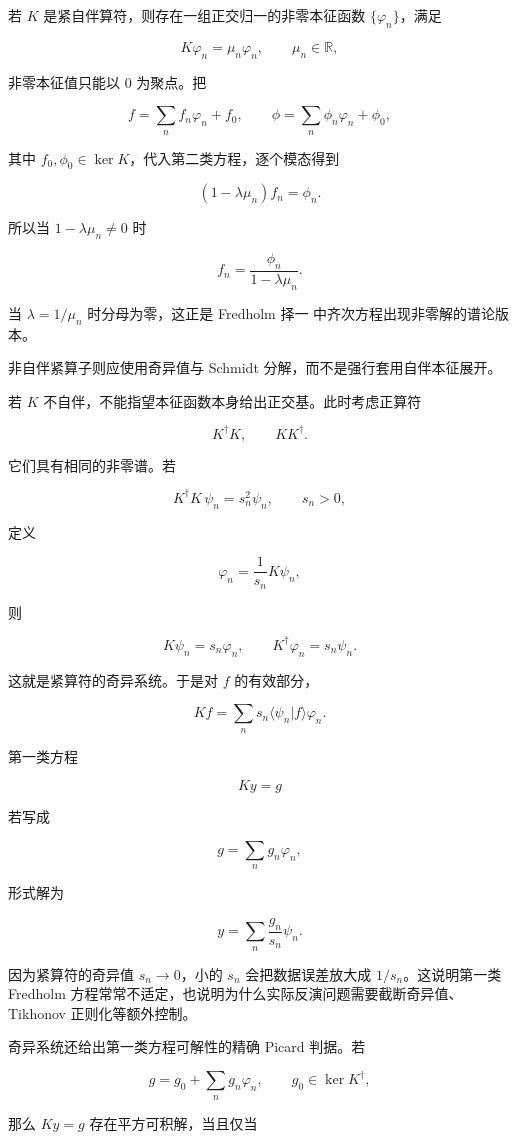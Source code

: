 若 $K$ 是紧自伴算符，则存在一组正交归一的非零本征函数 $\{\varphi_n\}$，满足

\[
K\varphi_n=\mu_n\varphi_n,
\qquad \mu_n\in\mathbb R,
\]

非零本征值只能以 $0$ 为聚点。把

\[
f=\sum_n f_n\varphi_n+f_0,
\qquad
\phi=\sum_n\phi_n\varphi_n+\phi_0,
\]

其中 $f_0,\phi_0\in\ker K$，代入第二类方程，逐个模态得到

\[
(1-\lambda\mu_n)f_n=\phi_n.
\]

所以当 $1-\lambda\mu_n\neq0$ 时

\[
\boxed{f_n=\frac{\phi_n}{1-\lambda\mu_n}}.
\]

当 $\lambda=1/\mu_n$ 时分母为零，这正是 Fredholm 择一 中齐次方程出现非零解的谱论版本。

非自伴紧算子则应使用奇异值与 Schmidt 分解，而不是强行套用自伴本征展开。

若 $K$ 不自伴，不能指望本征函数本身给出正交基。此时考虑正算符

\[
K^\dagger K,\qquad KK^\dagger.
\]

它们具有相同的非零谱。若

\[
K^\dagger K\,\psi_n=s_n^2\psi_n,
\qquad s_n>0,
\]

定义

\[
\varphi_n=\frac1{s_n}K\psi_n,
\]

则

\[
K\psi_n=s_n\varphi_n,
\qquad
K^\dagger\varphi_n=s_n\psi_n.
\]

这就是紧算符的奇异系统。于是对 $f$ 的有效部分，

\[
Kf=\sum_n s_n\langle\psi_n|f\rangle\varphi_n.
\]

第一类方程

\[
Ky=g
\]

若写成

\[
g=\sum_n g_n\varphi_n,
\]

形式解为

\[
y=\sum_n\frac{g_n}{s_n}\psi_n.
\]

因为紧算符的奇异值 $s_n\to0$，小的 $s_n$ 会把数据误差放大成 $1/s_n$。这说明第一类 Fredholm 方程常常不适定，也说明为什么实际反演问题需要截断奇异值、Tikhonov 正则化等额外控制。

奇异系统还给出第一类方程可解性的精确 Picard 判据。若

\[
g=g_0+\sum_ng_n\varphi_n,
\qquad g_0\in\ker K^\dagger,
\]

那么 $Ky=g$ 存在平方可积解，当且仅当

